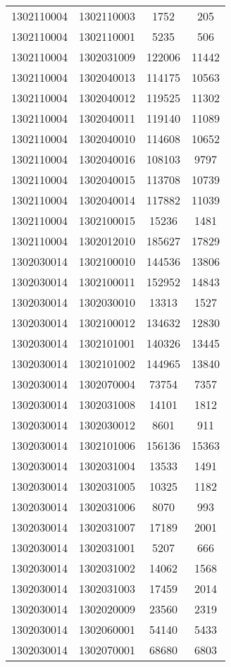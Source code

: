 \begin{longtable}{llcc}
1302110004 & 1302110003 & 1752 & 205\\
1302110004 & 1302110001 & 5235 & 506\\
1302110004 & 1302031009 & 122006 & 11442\\
1302110004 & 1302040013 & 114175 & 10563\\
1302110004 & 1302040012 & 119525 & 11302\\
1302110004 & 1302040011 & 119140 & 11089\\
1302110004 & 1302040010 & 114608 & 10652\\
1302110004 & 1302040016 & 108103 & 9797\\
1302110004 & 1302040015 & 113708 & 10739\\
1302110004 & 1302040014 & 117882 & 11039\\
1302110004 & 1302100015 & 15236 & 1481\\
1302110004 & 1302012010 & 185627 & 17829\\
1302030014 & 1302100010 & 144536 & 13806\\
1302030014 & 1302100011 & 152952 & 14843\\
1302030014 & 1302030010 & 13313 & 1527\\
1302030014 & 1302100012 & 134632 & 12830\\
1302030014 & 1302101001 & 140326 & 13445\\
1302030014 & 1302101002 & 144965 & 13840\\
1302030014 & 1302070004 & 73754 & 7357\\
1302030014 & 1302031008 & 14101 & 1812\\
1302030014 & 1302030012 & 8601 & 911\\
1302030014 & 1302101006 & 156136 & 15363\\
1302030014 & 1302031004 & 13533 & 1491\\
1302030014 & 1302031005 & 10325 & 1182\\
1302030014 & 1302031006 & 8070 & 993\\
1302030014 & 1302031007 & 17189 & 2001\\
1302030014 & 1302031001 & 5207 & 666\\
1302030014 & 1302031002 & 14062 & 1568\\
1302030014 & 1302031003 & 17459 & 2014\\
1302030014 & 1302020009 & 23560 & 2319\\
1302030014 & 1302060001 & 54140 & 5433\\
1302030014 & 1302070001 & 68680 & 6803\\

\end{longtable}
